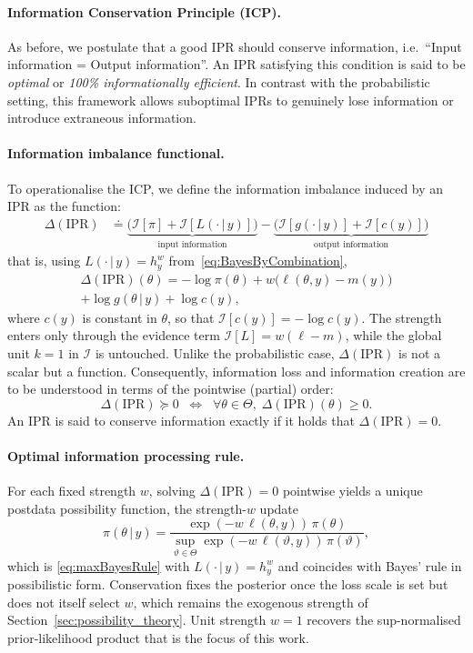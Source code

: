 \documentclass[accepted]{uai2026} %
\def\given{\,|\,}
\theoremstyle{remark}
\begin{document}
\paragraph{Information Conservation Principle (ICP).} As before, we postulate that a good IPR should conserve information, i.e.\ ``Input information = Output information''. An IPR satisfying this condition is said to be \emph{optimal} or \emph{100\% informationally efficient}. In contrast with the probabilistic setting, this framework allows suboptimal IPRs to genuinely lose information or introduce extraneous information.

\paragraph{Information imbalance functional.} To operationalise the ICP, we define the information imbalance induced by an IPR as the function:
\begin{align*}
\Delta(\text{IPR}) & \doteq \underbrace{\big( \mathcal{I}[\pi] + \mathcal{I}[L(\cdot \given y)] \big)}_{\text{input information}}
   - \underbrace{\big( \mathcal{I}[g(\cdot \given y)] + \mathcal{I}[c(y)] \big)}_{\text{output information}}
\end{align*}
that is, using $L(\cdot\given y) = h_y^{w}$ from~\eqref{eq:BayesByCombination},
\begin{multline}
\Delta(\text{IPR})(\theta) =
-\log \pi(\theta)
+ w\big(\ell(\theta,y)-m(y)\big) \\
+\log g(\theta \given y)
+\log c(y),
\end{multline}
where $c(y)$ is constant in $\theta$, so that $\mathcal{I}[c(y)] = -\log c(y)$.
The strength enters only through the evidence term $\mathcal I[L]=w(\ell-m)$,
while the global unit $k=1$ in $\mathcal I$ is untouched.
Unlike the probabilistic case, $\Delta(\text{IPR})$ is not a scalar but a function. Consequently, information loss and information creation are to be understood in terms of the pointwise (partial) order:
\[
\Delta(\text{IPR}) \succeq 0 \;\; \Longleftrightarrow \;\;
\forall \theta \in \Theta,\; \Delta(\text{IPR})(\theta) \ge 0.
\]
An IPR is said to conserve information exactly if it holds that $\Delta(\text{IPR}) = 0$.

\paragraph{Optimal information processing rule.} For each fixed strength $w$,
solving $\Delta(\text{IPR}) = 0$ pointwise yields a unique postdata possibility
function, the strength-$w$ update
\[
\pi(\theta\given y) = \frac{\exp(-w\,\ell(\theta,y))\,\pi(\theta)}
{\sup_{\vartheta\in\Theta}\exp(-w\,\ell(\vartheta,y))\,\pi(\vartheta)},
\]
which is \eqref{eq:maxBayesRule} with $L(\cdot \given y)=h_y^{w}$ and coincides with Bayes' rule
in possibilistic form. Conservation fixes the posterior once the loss scale is set
but does not itself select $w$, which remains the exogenous strength of
Section~\ref{sec:possibility_theory}. Unit strength $w=1$ recovers the
sup-normalised prior-likelihood product that is the focus of this work.
\end{document}
